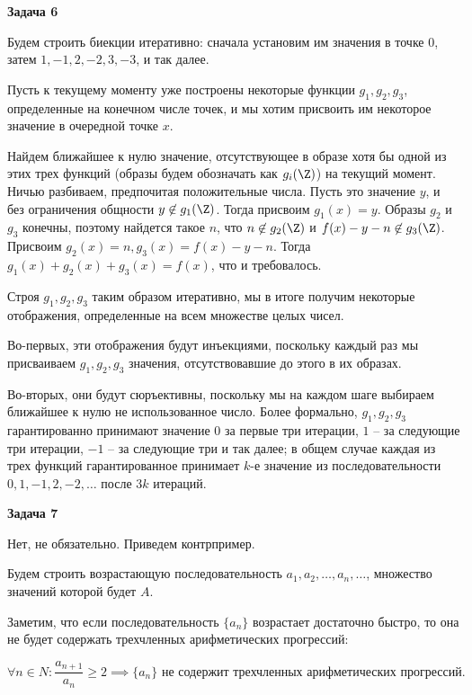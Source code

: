 	\begin{center}
    \textbf{Задача 6}
\end{center}
		Будем строить биекции итеративно: сначала установим им значения в точке $0$, затем $1, -1, 2, -2, 3, -3$, и так далее.

		Пусть к текущему моменту уже построены некоторые функции $g_1, g_2, g_3$, определенные на конечном числе точек, и мы хотим присвоить им некоторое значение в очередной точке $x$.

		Найдем ближайшее к нулю значение, отсутствующее в образе хотя бы одной из этих трех функций (образы будем обозначать как $g_i(\Z)$) на текущий момент. Ничью разбиваем, предпочитая положительные числа. Пусть это значение $y$, и без ограничения общности $y \not\in g_1(\Z)$. Тогда присвоим $g_1(x) = y$. Образы $g_2$ и $g_3$ конечны, поэтому найдется такое $n$, что $n \not\in g_2(\Z)$ и $f(x) - y - n \not\in g_3(\Z)$. Присвоим $g_2(x) = n, g_3(x) = f(x) - y - n$. Тогда $g_1(x) + g_2(x) + g_3(x) = f(x)$, что и требовалось.

		Строя $g_1, g_2, g_3$ таким образом итеративно, мы в итоге получим некоторые отображения, определенные на всем множестве целых чисел.

		Во-первых, эти отображения будут инъекциями, поскольку каждый раз мы присваиваем $g_1, g_2, g_3$ значения, отсутствовавшие до этого в их образах.

		Во-вторых, они будут сюръективны, поскольку мы на каждом шаге выбираем ближайшее к нулю не использованное число. Более формально, $g_1, g_2, g_3$ гарантированно принимают значение $0$ за первые три итерации, $1$ -- за следующие три итерации, $-1$ -- за следующие три и так далее; в общем случае каждая из трех функций гарантированное принимает $k$-е значение из последовательности $0, 1, -1, 2, -2, \dots$ после $3k$ итераций.


	\begin{center}
    \textbf{Задача 7}
\end{center}
		Нет, не обязательно. Приведем контрпример.

		Будем строить возрастающую последовательность $a_1, a_2, \dots, a_n, \dots$, множество значений которой будет $A$.

		Заметим, что если последовательность $\{a_n\}$ возрастает достаточно быстро, то она не будет содержать трехчленных арифметических прогрессий:

		\begin{equation*}
			\forall n \in N: \frac{a_{n+1}}{a_n} \ge 2 \implies \{a_n\} \text{ не содержит трехчленных арифметических прогрессий}.
		\end{equation*}

